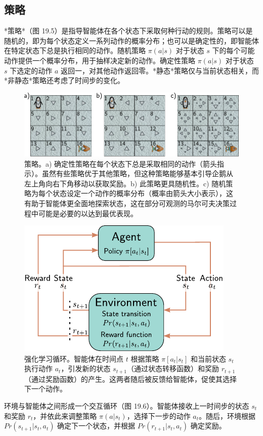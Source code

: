 \documentclass[lang=cn,newtx,10pt,scheme=chinese]{elegantbook}
\begin{document}
\subsection{策略}
*策略*（图 19.5）是指导智能体在各个状态下采取何种行动的规则。策略可以是随机的，即为每个状态定义一系列动作的概率分布；也可以是确定性的，即智能体在特定状态下总是执行相同的动作。随机策略 \(\pi(a|s)\) 对于状态 \(s\) 下的每个可能动作提供一个概率分布，用于抽样决定新的动作。确定性策略 \(\pi(a|s)\) 对于状态 \(s\) 下选定的动作 \(a\) 返回一，对其他动作返回零。*静态*策略仅与当前状态相关，而*非静态*策略还考虑了时间步的变化。
\begin{figure}[ht!]
\centering
\includegraphics[width=0.7\linewidth]{PDFFigures/UDLChap19PDF/ReinforcePolicy.pdf}
\caption{策略。a) 确定性策略在每个状态下总是采取相同的动作（箭头指示）。虽然有些策略优于其他策略，但这种策略能够基本引导企鹅从左上角向右下角移动以获取奖励。b) 此策略更具随机性。c) 随机策略为每个状态设定一个动作的概率分布（概率由箭头大小表示），这有助于智能体更全面地探索状态，这在部分可观测的马尔可夫决策过程中可能是必要的以达到最优表现。}
\end{figure}

\begin{figure}[ht!]
\centering
\includegraphics[width=0.7\linewidth]{PDFFigures/UDLChap19PDF/ReinforceMDPLoop.pdf}
\caption{强化学习循环。智能体在时间点 \(t\) 根据策略 \(\pi[a_t|s_t]\) 和当前状态 \(s_t\) 执行动作 \(a_t\)，引发新的状态 \(s_{t+1}\)（通过状态转移函数）和奖励 \(r_{t+1}\)（通过奖励函数）的产生。这两者随后被反馈给智能体，促使其选择下一个动作。}
\end{figure}

环境与智能体之间形成一个交互循环（图 19.6）。智能体接收上一时间步的状态 \(s_t\) 和奖励 \(r_t\)，并依此来调整策略 \(\pi(a|s_t)\)，选择下一步的动作 \(a_t\)。随后，环境根据 \(Pr(s_{t+1}|s_t, a_t)\) 确定下一个状态，并根据 \(Pr(r_{t+1}|s_t, a_t)\) 确定奖励。
\end{document}

